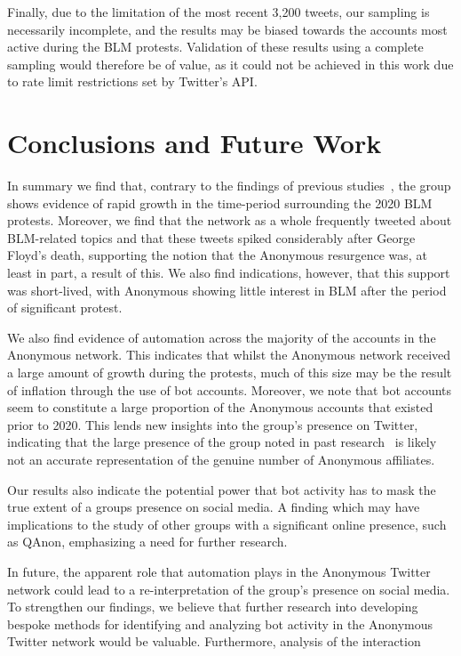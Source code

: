 \documentclass[letterpaper]{article}
\begin{document}
Finally, due to the limitation of the most recent 3,200 tweets, our sampling is necessarily incomplete, and the results may be biased towards the accounts most active during the BLM protests. Validation of these results using a complete sampling would therefore be of value, as it could not be achieved in this work due to rate limit restrictions set by Twitter's API.

\section{Conclusions and Future Work}

In summary we find that, contrary to the findings of previous studies~\cite{Jones2020,Uitermark2017}, the group shows evidence of rapid growth in the time-period surrounding the 2020 BLM protests. Moreover, we find that the network as a whole frequently tweeted about BLM-related topics and that these tweets spiked considerably after George Floyd's death, supporting the notion that the Anonymous resurgence was, at least in part, a result of this. We also find indications, however, that this support was short-lived, with Anonymous showing little interest in BLM after the period of significant protest.

We also find evidence of automation across the majority of the accounts in the Anonymous network. This indicates that whilst the Anonymous network received a large amount of growth during the protests, much of this size may be the result of inflation through the use of bot accounts. Moreover, we note that bot accounts seem to constitute a large proportion of the Anonymous accounts that existed prior to 2020. This lends new insights into the group's presence on Twitter, indicating that the large presence of the group noted in past research~\cite{Jones2020} is likely not an accurate representation of the genuine number of Anonymous affiliates.

Our results also indicate the potential power that bot activity has to mask the true extent of a groups presence on social media. A finding which may have implications to the study of other groups with a significant online presence, such as QAnon, emphasizing a need for further research.

In future, the apparent role that automation plays in the Anonymous Twitter network could lead to a re-interpretation of the group's presence on social media. To strengthen our findings, we believe that further research into developing bespoke methods for identifying and analyzing bot activity in the Anonymous Twitter network would be valuable. Furthermore, analysis of the interaction


\fontsize{9.0pt}{10.0pt}
\selectfont
\clearpage

\end{document}

